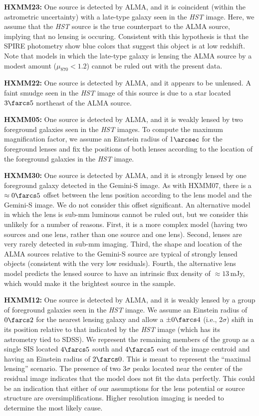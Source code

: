 \documentclass[iop]{emulateapj}
\begin{document}
{\bf HXMM23:} One source is detected by ALMA, and it is coincident (within the
astrometric uncertainty) with a late-type galaxy seen in the {\it HST} image.
Here, we assume that the {\it HST} source is the true counterpart to the ALMA
source, implying that no lensing is occuring.  Consistent with this hypothesis
is that the SPIRE photometry show blue colors that suggest this object is at low
redshift.  Note that models in which the late-type galaxy is lensing the ALMA
source by a modest amount ($\mu_{870} < 1.2$) cannot be ruled out with the
present data.

{\bf HXMM22:} One source is detected by ALMA, and it appears to be unlensed.  A
faint smudge seen in the {\it HST} image of this source is due to a star
located $3\farcs5$ northeast of the ALMA source.

{\bf HXMM05:} One source is detected by ALMA, and it is weakly lensed by two
foreground galaxies seen in the {\it HST} images.  To compute the maximum
magnification factor, we assume an Einstein radius of 1$\arcsec$ for the
foreground lenses and fix the positions of both lenses according to the
location of the foreground galaxies in the {\it HST} image.


{\bf HXMM30:} One source is detected by ALMA, and it is strongly lensed by one
foreground galaxy detected in the Gemini-S image.  As with HXMM07, there is a
$\approx 0\farcs5$ offset between the lens position according to the lens model
and the Gemini-S image.  We do not consider this offset significant.  An
alternative model in which the lens is sub-mm luminous cannot be ruled out, but
we consider this unlikely for a number of reasons.  First, it is a more complex
model (having two sources and one lens, rather than one source and one lens).
Second, lenses are very rarely detected in sub-mm imaging.  Third, the shape
and location of the ALMA sources relative to the Gemini-S source are typical of
strongly lensed objects (consistent with the very low residuals).  Fourth, the
alternative lens model predicts the lensed source to have an intrinsic flux
density of $\approx 13 \,$mJy, which would make it the brightest source in the
sample.

{\bf HXMM12:} One source is detected by ALMA, and it is weakly lensed by a
group of foreground galaxies seen in the {\it HST} image.  We assume an
Einstein radius of $0\farcs2$ for the nearest lensing galaxy and allow a
$\pm0\farcs4$ (i.e., 2$\sigma$) shift in its position relative to that
indicated by the {\it HST} image (which has its astrometry tied to SDSS).  We
represent the remaining members of the group as a single SIS located $4\farcs5$
south and $4\farcs5$ east of the image centroid and having an Einstein radius
of $2\farcs0$.  This is meant to represent the ``maximal lensing'' scenario.
The presence of two $3\sigma$ peaks located near the center of the residual
image indicates that the model does not fit the data perfectly.  This could be
an indication that either of our assumptions for the lens potential or source
structure are oversimplifications.  Higher resolution imaging is needed to
determine the most likely cause.
\end{document}

